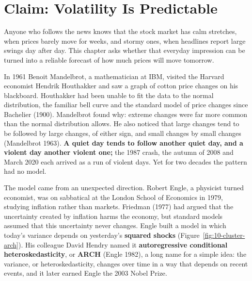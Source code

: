 \makeatletter
{}
\makeatother

\chapter{Claim: Volatility Is Predictable}
\label{ch:07}

Anyone who follows the news knows that the stock market has calm stretches, when prices barely move for weeks, and stormy ones, when headlines report large swings day after day. This chapter asks whether that everyday impression can be turned into a reliable forecast of how much prices will move tomorrow.

In 1961 Benoit Mandelbrot, a mathematician at IBM, visited the Harvard economist Hendrik Houthakker and saw a graph of cotton price changes on his blackboard. Houthakker had been unable to fit the data to the normal distribution, the familiar bell curve and the standard model of price changes since Bachelier (1900). Mandelbrot found why: extreme changes were far more common than the normal distribution allows. He also noticed that large changes tend to be followed by large changes, of either sign, and small changes by small changes (Mandelbrot 1963). \textbf{A quiet day tends to follow another quiet day, and a violent day another violent one;} the 1987 crash, the autumn of 2008 and March 2020 each arrived as a run of violent days. Yet for two decades the pattern had no model.

The model came from an unexpected direction. Robert Engle, a physicist turned economist, was on sabbatical at the London School of Economics in 1979, studying inflation rather than markets. Friedman (1977) had argued that the uncertainty created by inflation harms the economy, but standard models assumed that this uncertainty never changes. Engle built a model in which today's variance depends on yesterday's \textbf{squared shocks} (Figure~\ref{fig:10-cluster-arch}). His colleague David Hendry named it \textbf{autoregressive conditional heteroskedasticity}, or \textbf{ARCH} (Engle 1982), a long name for a simple idea: the variance, or heteroskedasticity, changes over time in a way that depends on recent events, and it later earned Engle the 2003 Nobel Prize.

